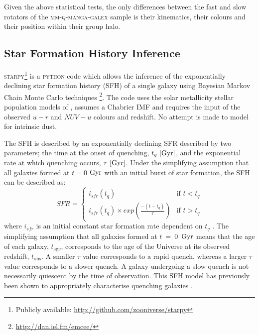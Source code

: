 \documentclass[useAMS,usenatbib]{mn2e}
\begin{document}
Given the above statistical tests, the only differences between the fast and slow rotators of the \textsc{mm-q-manga-galex} sample is their kinematics, their colours and their position within their group halo.


\subsection{Star Formation History Inference}\label{sec:starpy}

\textsc{starpy}\footnote{Publicly available: \url{http://github.com/zooniverse/starpy}} is a \textsc{python} code which allows the inference of the exponentially declining star formation history (SFH) of a single galaxy using  Bayesian Markov Chain Monte Carlo techniques \citep{emcee13}\footnote{\url{http://dan.iel.fm/emcee/}}. The code uses the solar metallicity stellar population models of \cite[][hereafter BC03]{BC03}, assumes a Chabrier IMF \citep{chabrier03} and requires the input of the observed $u-r$ and $NUV-u$ colours and redshift. No attempt is made to model for intrinsic dust. 

The SFH is described by an exponentially declining SFR described by two parameters; the time at the onset of quenching, $t_q~\rm{[Gyr]}$, and the exponential rate at which quenching occurs, $\tau~\rm{[Gyr]}$. Under the simplifying assumption that all galaxies formed at $t=0$ $\rm{ Gyr}$ with an initial burst of star formation, the SFH can be described as:
\begin{equation}\label{sfh}
SFR =
\begin{cases}
i_{sfr}(t_q) & \text{if } t < t_q \\
i_{sfr}(t_q) \times exp{\left( \frac{-(t-t_{q})}{\tau}\right)} & \text{if } t > t_q 
\end{cases}
\end{equation}
where $i_{sfr}$ is an initial constant star formation rate dependent on $t_q$ \citep{schawinski14, smethurst15}. The simplifying assumption that all galaxies formed at $t~=~0$~$\rm{Gyr}$ means that the age of each galaxy, $t_\mathrm{age}$, corresponds to the age of the Universe at its observed redshift, $t_\mathrm{obs}$. A smaller $\tau$ value corresponds to a rapid quench, whereas a larger $\tau$ value corresponds to a slower quench. A galaxy undergoing a slow quench is not necessarily quiescent by the time of observation. This SFH model has previously been shown to appropriately characterise quenching galaxies \citep{Weiner06, Martin07, Noeske07,schawinski14}. 
\end{document}

